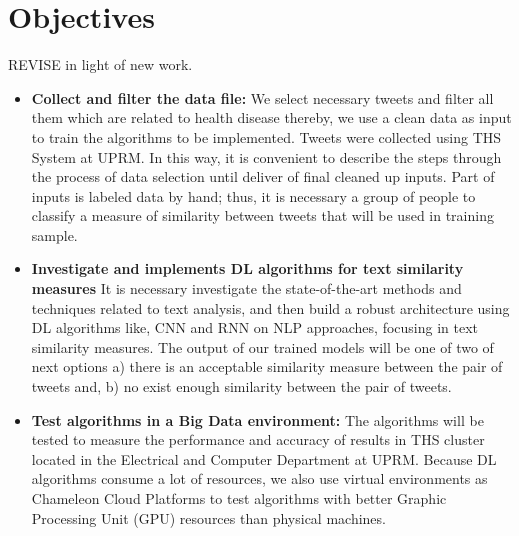 \documentclass[12pt]{report}
\begin{document}
\section{Objectives}
REVISE in light of new work.
\begin{itemize}[nolistsep]
	\item \textbf{Collect and filter the data file: } We select necessary tweets and filter all them which are related to health disease thereby, we use a clean data as input to train the algorithms to be implemented. Tweets were collected using \ac{THS} System at \ac{UPRM}. In this way, it is convenient to describe the steps through the process of data selection until deliver of final cleaned up inputs. Part of inputs is labeled data by hand; thus, it is necessary a group of people to classify a measure of similarity between tweets that will be used in training sample.
	\item \textbf{Investigate and implements \ac{DL} algorithms for text similarity measures} It is necessary investigate the state-of-the-art methods and techniques related to text analysis, and then build a robust architecture using \ac{DL} algorithms like, \ac{CNN} and \ac{RNN} on \ac{NLP} approaches,  focusing in text similarity measures. The output of our trained models will be one of two of next options a) there is an acceptable similarity measure between the pair of tweets and, b) no exist enough similarity between the pair of tweets.
	\item \textbf{Test algorithms in a Big Data environment: } The algorithms will be tested to measure the performance and accuracy of results in \ac{THS} cluster located in the Electrical and Computer Department at \ac{UPRM}. Because \ac{DL} algorithms consume a lot of resources, we also use virtual environments as Chameleon Cloud Platforms to test algorithms with better Graphic Processing Unit (GPU) resources than physical machines.
\end{itemize}
\end{document}
